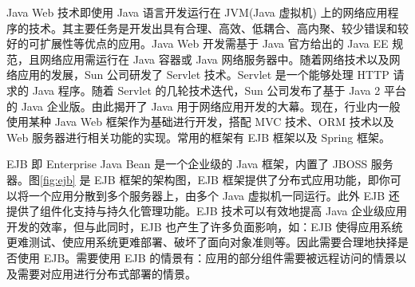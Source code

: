 Java Web 技术即使用 Java 语言开发运行在 JVM(Java 虚拟机) 上的网络应用程序的技术。其主要任务是开发出具有合理、高效、低耦合、高内聚、较少错误和较好的可扩展性等优点的应用\cite{arnold2005java}。Java Web 开发需基于 Java 官方给出的 Java EE 规范，且网络应用需运行在 Java 容器或 Java 网络服务器中。随着网络技术以及网络应用的发展，Sun 公司研发了 Servlet 技术。Servlet 是一个能够处理 HTTP 请求的 Java 程序。随着 Servlet 的几轮技术迭代，Sun 公司发布了基于 Java 2 平台的 Java 企业版。由此揭开了 Java 用于网络应用开发的大幕。现在，行业内一般使用某种 Java Web 框架作为基础进行开发，搭配 MVC 技术、ORM 技术以及 Web 服务器进行相关功能的实现。常用的框架有 EJB 框架以及 Spring 框架\cite{williams2014professional}。

EJB 即 Enterprise Java Bean 是一个企业级的 Java 框架，内置了 JBOSS 服务器。图\ref{fig:ejb} 是 EJB 框架的架构图，EJB 框架提供了分布式应用功能，即你可以将一个应用分散到多个服务器上，由多个 Java 虚拟机一同运行\cite{johnson2004expert}。此外 EJB 还提供了组件化支持与持久化管理功能。EJB 技术可以有效地提高 Java 企业级应用开发的效率，但与此同时，EJB 也产生了许多负面影响，如：EJB 使得应用系统更难测试、使应用系统更难部署、破坏了面向对象准则等。因此需要合理地抉择是否使用 EJB。需要使用 EJB 的情景有：应用的部分组件需要被远程访问的情景以及需要对应用进行分布式部署的情景。





